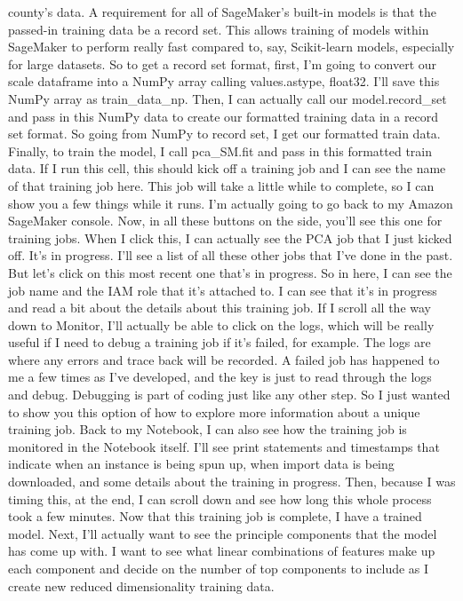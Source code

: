 county's data. A requirement for all of SageMaker's built-in models is
that the passed-in training data be a record set. This allows training
of models within SageMaker to perform really fast compared to, say,
Scikit-learn models, especially for large datasets. So to get a record
set format, first, I'm going to convert our scale dataframe into a NumPy
array calling values.astype, float32. I'll save this NumPy array as
train\_data\_np. Then, I can actually call our model.record\_set and
pass in this NumPy data to create our formatted training data in a
record set format. So going from NumPy to record set, I get our
formatted train data. Finally, to train the model, I call pca\_SM.fit
and pass in this formatted train data. If I run this cell, this should
kick off a training job and I can see the name of that training job
here. This job will take a little while to complete, so I can show you a
few things while it runs. I'm actually going to go back to my Amazon
SageMaker console. Now, in all these buttons on the side, you'll see
this one for training jobs. When I click this, I can actually see the
PCA job that I just kicked off. It's in progress. I'll see a list of all
these other jobs that I've done in the past. But let's click on this
most recent one that's in progress. So in here, I can see the job name
and the IAM role that it's attached to. I can see that it's in progress
and read a bit about the details about this training job. If I scroll
all the way down to Monitor, I'll actually be able to click on the logs,
which will be really useful if I need to debug a training job if it's
failed, for example. The logs are where any errors and trace back will
be recorded. A failed job has happened to me a few times as I've
developed, and the key is just to read through the logs and debug.
Debugging is part of coding just like any other step. So I just wanted
to show you this option of how to explore more information about a
unique training job. Back to my Notebook, I can also see how the
training job is monitored in the Notebook itself. I'll see print
statements and timestamps that indicate when an instance is being spun
up, when import data is being downloaded, and some details about the
training in progress. Then, because I was timing this, at the end, I can
scroll down and see how long this whole process took a few minutes. Now
that this training job is complete, I have a trained model. Next, I'll
actually want to see the principle components that the model has come up
with. I want to see what linear combinations of features make up each
component and decide on the number of top components to include as I
create new reduced dimensionality training data.


